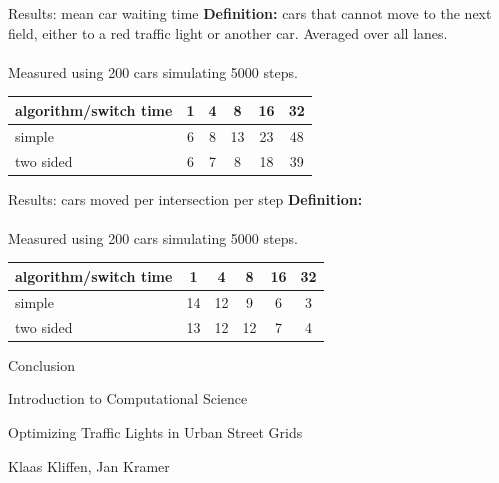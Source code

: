 \documentclass[11pt]{beamer}
\begin{document}
\begin{frame}{Results: mean car waiting time}
\textbf{Definition:} cars that cannot move to the next field, either to a 
red traffic light or another car. Averaged over all lanes.\\~\\
Measured using 200 cars simulating 5000 steps.

\begin{table}
\centering
\begin{tabular}{l|c|c|c|c|c}
algorithm/switch time & 1 & 4 & 8 & 16 & 32\\
\hline
simple & 6 & 8 & 13 & 23 & 48\\
two sided & 6 & 7 & 8 & 18 & 39\\
\end{tabular}
\end{table}
 
\end{frame}

\begin{frame}{Results: cars moved per intersection per step}
\textbf{Definition:}\\~\\
Measured using 200 cars simulating 5000 steps.
\begin{table}
\centering
\begin{tabular}{l|c|c|c|c|c}
algorithm/switch time & 1 & 4 & 8 & 16 & 32\\
\hline
simple & 14 & 12 & 9 & 6 & 3\\
two sided & 13 & 12 & 12 & 7 & 4\\
\end{tabular}
\end{table}
 
\end{frame}


\begin{frame}{Conclusion}
    
\end{frame}

\begin{frame}{Introduction to Computational Science}
\begin{center}
{\large Optimizing Traffic Lights in Urban Street Grids}\\
\end{center}

\begin{center}
Klaas Kliffen, Jan Kramer
\end{center}

    
\end{frame}
\end{document}
